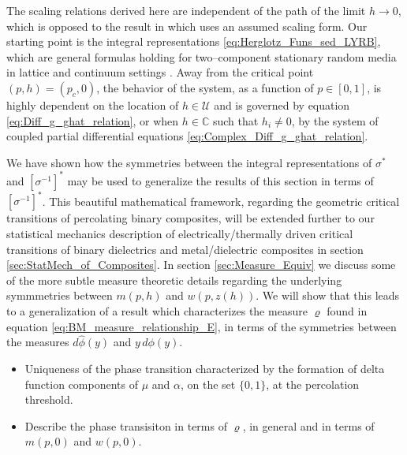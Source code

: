 \documentclass[english,12pt,jmp,graphicx]{revtex4-1}
\newcommand{\ph}{\hat{\phi}}
\begin{document}
The scaling relations derived here are independent of the path of the
limit $h\to0$, which is opposed to the result in \cite{Efros:PSSB-303}
which uses an assumed scaling form. Our starting point is the integral
representations \eqref{eq:Herglotz_Funs_sed_LYRB}, which are general
formulas holding for two--component stationary random media in lattice
and continuum settings \cite{Golden:PRL-3935}. Away from the critical
point $(p,h)=(p_c,0)$, the behavior of the system, as a function of
$p\in[0,1]$, is highly dependent on the location of $h\in\mathcal{U}$ and
is governed by equation \eqref{eq:Diff_g_ghat_relation}, or when
$h\in\mathbb{C}$ such that $h_i\neq0$, by the system of coupled partial
differential equations \eqref{eq:Complex_Diff_g_ghat_relation}.  

We have shown how the symmetries between the 
integral representations of $\sigma^*$ and $[\sigma^{-1}]^*$ may be used to
generalize the results of this section in terms of
$[\sigma^{-1}]^*$. This beautiful mathematical framework, regarding the
geometric critical transitions of percolating binary composites, will
be extended further to our statistical mechanics description of
electrically/thermally driven critical transitions of binary
dielectrics and metal/dielectric composites in section
\ref{sec:StatMech_of_Composites}. In section \ref{sec:Measure_Equiv}
we discuss some of the more subtle measure theoretic details regarding
the underlying symmmetries between $m(p,h)$ and $w(p,z(h))$. We will
show that this leads to a generalization of a result
\cite{Day:JPCM-96} which characterizes the measure $\varrho$ found in
equation \eqref{eq:BM_measure_relationship_E}, in terms of the
symmetries between the measures $d\ph(y)$ and $y\,d\phi(y)$.   

\begin{itemize}
\item Uniqueness of the phase transition characterized by the
  formation of delta function components of $\mu$ and $\alpha$, on the set
  $\{0,1\}$, at the percolation threshold.
\item Describe the phase transisiton in terms of $\varrho$, in general and
  in terms of $m(p,0)$ and $w(p,0)$.
\end{itemize}




\end{document}
